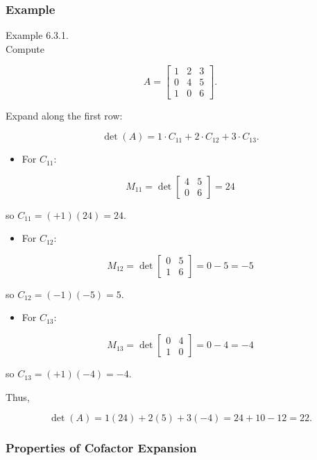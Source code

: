 \documentclass[
  12pt,
  a4paper,
]{article}
\begin{document}
\subsubsection{Example}\label{example-5}

Example 6.3.1.\\
Compute

\[A = \begin{bmatrix}
1 & 2 & 3 \\
0 & 4 & 5 \\
1 & 0 & 6
\end{bmatrix}.\]

Expand along the first row:

\[\det(A) = 1 \cdot C_{11} + 2 \cdot C_{12} + 3 \cdot C_{13}.\]

\begin{itemize}
\item
  For \(C_{11}\):
\end{itemize}

\[M_{11} = \det \begin{bmatrix} 4 & 5 \\ 0 & 6 \end{bmatrix} = 24\]

so \(C_{11} = (+1)(24) = 24\).

\begin{itemize}
\item
  For \(C_{12}\):
\end{itemize}

\[M_{12} = \det \begin{bmatrix} 0 & 5 \\ 1 & 6 \end{bmatrix} = 0 - 5 = -5\]

so \(C_{12} = (-1)(-5) = 5\).

\begin{itemize}
\item
  For \(C_{13}\):
\end{itemize}

\[M_{13} = \det \begin{bmatrix} 0 & 4 \\ 1 & 0 \end{bmatrix} = 0 - 4 = -4\]

so \(C_{13} = (+1)(-4) = -4\).

Thus,

\[\det(A) = 1(24) + 2(5) + 3(-4) = 24 + 10 - 12 = 22.\]

\subsubsection{Properties of Cofactor
Expansion}\label{properties-of-cofactor-expansion}
\end{document}
